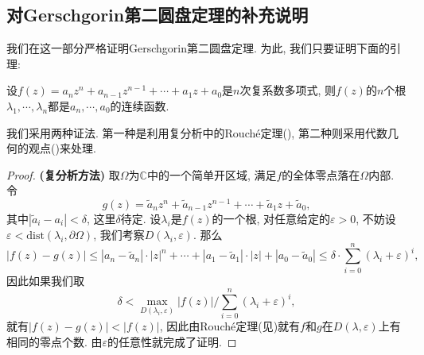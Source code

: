 \subsection{对Gerschgorin第二圆盘定理的补充说明}\label{Sec1.4}
我们在这一部分严格证明Gerschgorin第二圆盘定理. 为此, 我们只要证明下面的引理:
\begin{lemma}
设$f(z)=a_nz^n+a_{n-1}z^{n-1}+\cdots+a_1z+a_0$是$n$次复系数多项式, 则$f(z)$的$n$个根$\lambda_1,\cdots,\lambda_n$都是$a_n,\cdots,a_0$的连续函数.
\end{lemma}
我们采用两种证法. 第一种是利用复分析中的Rouché定理(\cite{蒋尔雄1978线性代数}), 第二种则采用代数几何的观点(\cite{whitneycomplex})来处理.\par
\begin{proof}{\textbf{(复分析方法)}}
取$\Omega$为$\mathbb{C}$中的一个简单开区域, 满足$f$的全体零点落在$\Omega$内部. 令
$$
g\left( z \right) =\tilde{a}_nz^n+\tilde{a}_{n-1}z^{n-1}+\cdots +\tilde{a}_1z+\tilde{a}_0,
$$
其中$|\tilde{a}_i-a_i|<\delta$, 这里$\delta$待定. 设$\lambda_i$是$f(z)$的一个根, 对任意给定的$\varepsilon>0$, 不妨设$\varepsilon<\mathrm{dist}(\lambda_i,\partial\Omega)$, 我们考察$D(\lambda_i,\varepsilon)$. 那么
$$
\left| f\left( z \right) -g\left( z \right) \right|\le \left| a_n-\tilde{a}_n \right|\cdot \left| z \right|^n+\cdots +\left| a_1-\tilde{a}_1 \right|\cdot \left| z \right|+\left| a_0-\tilde{a}_0 \right|\le \delta \cdot \sum_{i=0}^n{\left( \lambda _i+\varepsilon \right) ^i},
$$
因此如果我们取
$$
\delta <\max_{D\left( \lambda _i,\varepsilon \right)} \left| f\left( z \right) \right|/\sum_{i=0}^n{\left( \lambda _i+\varepsilon \right) ^i},
$$
就有$|f(z)-g(z)|<|f(z)|$, 因此由Rouché定理(见\cite{rudin_2015_real})就有$f$和$g$在$D(\lambda,\varepsilon)$上有相同的零点个数. 由$\varepsilon$的任意性就完成了证明.
\end{proof}
